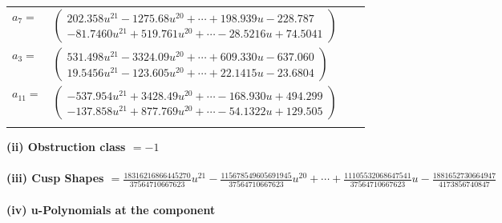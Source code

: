 \documentclass[1p]{elsarticle_modified}
\theoremstyle{definition}
\begin{document}
\begin{tabular}{m{7pt} m{180pt} m{7pt} m{180pt} }
\flushright $a_{7}=$&$\begin{pmatrix}202.358 u^{21}-1275.68 u^{20}+\cdots+198.939 u-228.787\\-81.7460 u^{21}+519.761 u^{20}+\cdots-28.5216 u+74.5041\end{pmatrix}$ \\
\flushright $a_{3}=$&$\begin{pmatrix}531.498 u^{21}-3324.09 u^{20}+\cdots+609.330 u-637.060\\19.5456 u^{21}-123.605 u^{20}+\cdots+22.1415 u-23.6804\end{pmatrix}$ \\
\flushright $a_{11}=$&$\begin{pmatrix}-537.954 u^{21}+3428.49 u^{20}+\cdots-168.930 u+494.299\\-137.858 u^{21}+877.769 u^{20}+\cdots-54.1322 u+129.505\end{pmatrix}$\\&\end{tabular}
\flushleft \textbf{(ii) Obstruction class $= -1$}\\~\\
\flushleft \textbf{(iii) Cusp Shapes $= \frac{18316216866445270}{37564710667623} u^{21}-\frac{115678549605691945}{37564710667623} u^{20}+\cdots+\frac{11105532068647541}{37564710667623} u-\frac{1881652730664947}{4173856740847}$}\\~\\
\newpage\renewcommand{\arraystretch}{1}
\flushleft \textbf{(iv) u-Polynomials at the component}\newline \\
\end{document}

